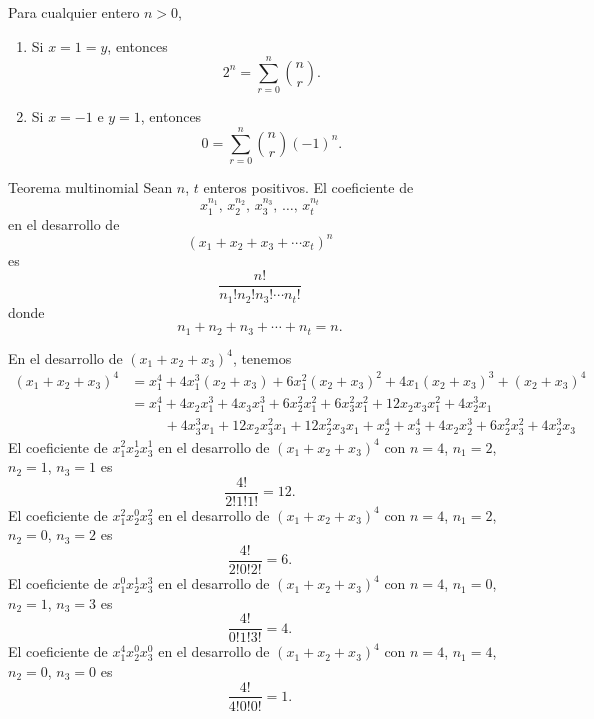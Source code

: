 \newpage

\begin{corollary}
    \label{SIISNKISUSJD}
    Para cualquier entero $n > 0$,
    \begin{enumerate}[label=\alph*)]
        \item Si $x = 1 = y$, entonces
        $$2^n = \sum_{r=0}^{n} \binom{n}{r}.$$
        \item Si $x = -1$ e $y = 1$, entonces
        $$0 = \sum_{r=0}^{n} \binom{n}{r} (-1)^{n}.$$
    \end{enumerate}
\end{corollary}

\begin{theorem}{Teorema multinomial}{}
    Sean $n$, $t$ enteros positivos. El coeficiente de
    $$x_1^{n_1}, \, x_2^{n_2}, \, x_3^{n_3}, \, \dots, \, x_t^{n_t}$$
    en el desarrollo de
    $$(x_1 + x_2 + x_3 + \cdots x_t)^n$$
    es
    $$\frac{n!}{n_1!n_2!n_3! \cdots n_t!}$$
    donde
    $$n_1 + n_2 + n_3 + \cdots + n_t = n.$$
\end{theorem}

\begin{myexample}
    En el desarrollo de $(x_1 + x_2 + x_3)^4$, tenemos
    \begin{align*}
        (x_1 + x_2 + x_3)^4 & = x_1^4 + 4x_1^3(x_2 + x_3) + 6x_1^2(x_2+x_3)^2 + 4x_1(x_2+x_3)^3 + (x_2+x_3)^4 \\
        & = x_1^4 + 4x_2x_1^3 + 4x_3x_1^3 + 6x_2^2x_1^2 + 6x_3^2x_1^2 + 12x_2x_3x_1^2 + 4x_2^3x_1 \\
        & \hspace{1cm} +4x_3^3x_1 + 12x_2x_3^2x_1 + 12x_2^2x_3x_1 + x_2^4 + x_3^4 + 4x_2x_2^3 + 6x_2^2x_3^2 + 4x_2^3x_3
    \end{align*}
    El coeficiente de $x_1^2x_2^1x_3^1$ en el desarrollo de $(x_1 + x_2 + x_3)^4$ con $n = 4$, $n_1 = 2$, $n_2 = 1$, $n_3 = 1$ es
    $$\frac{4!}{2!1!1!} = 12.$$
    El coeficiente de $x_1^2x_2^0x_3^2$ en el desarrollo de $(x_1 + x_2 + x_3)^4$ con $n = 4$, $n_1 = 2$, $n_2 = 0$, $n_3 = 2$ es
    $$\frac{4!}{2!0!2!} = 6.$$
    El coeficiente de $x_1^0x_2^1x_3^3$ en el desarrollo de $(x_1 + x_2 + x_3)^4$ con $n = 4$, $n_1 = 0$, $n_2 = 1$, $n_3 = 3$ es
    $$\frac{4!}{0!1!3!} =4.$$
    El coeficiente de $x_1^4x_2^0x_3^0$ en el desarrollo de $(x_1 + x_2 + x_3)^4$ con $n = 4$, $n_1 = 4$, $n_2 = 0$, $n_3 = 0$ es
    $$\frac{4!}{4!0!0!} = 1.$$
\end{myexample}

\newpage

